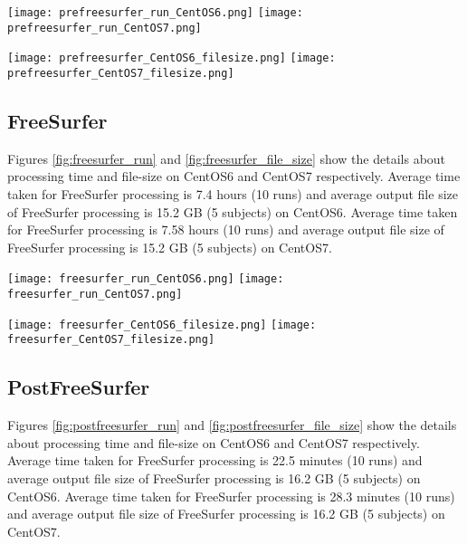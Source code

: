 \begin{center}
\texttt{[image: prefreesurfer\_run\_CentOS6.png]}%
\texttt{[image: prefreesurfer\_run\_CentOS7.png]}
\label{fig:prefreesurfer_run}
\end{center}

\begin{center}
\texttt{[image: prefreesurfer\_CentOS6\_filesize.png]}%
\texttt{[image: prefreesurfer\_CentOS7\_filesize.png]}
\label{fig:prefreesurfer_file_size}
\end{center}

\subsection{FreeSurfer}
Figures \ref{fig:freesurfer_run} and \ref{fig:freesurfer_file_size} show the details about processing time and file-size on CentOS6 and CentOS7 respectively.
Average time taken for FreeSurfer processing is 7.4 hours (10 runs) and average output file size of FreeSurfer processing is 15.2 GB (5 subjects) on CentOS6.
Average time taken for FreeSurfer processing is 7.58 hours (10 runs) and average output file size of FreeSurfer processing is 15.2 GB (5 subjects) on CentOS7.

\begin{center}
\texttt{[image: freesurfer\_run\_CentOS6.png]}%
\texttt{[image: freesurfer\_run\_CentOS7.png]}
\label{fig:freesurfer_run}
\end{center}

\begin{center}
\texttt{[image: freesurfer\_CentOS6\_filesize.png]}%
\texttt{[image: freesurfer\_CentOS7\_filesize.png]}
\label{fig:freesurfer_file_size}
\end{center}

\subsection{PostFreeSurfer}
Figures \ref{fig:postfreesurfer_run} and \ref{fig:postfreesurfer_file_size} show the details about processing time and file-size on CentOS6 and CentOS7 respectively.
Average time taken for FreeSurfer processing is 22.5 minutes (10 runs) and average output file size of FreeSurfer processing is 16.2 GB (5 subjects) on CentOS6.
Average time taken for FreeSurfer processing is 28.3 minutes (10 runs) and average output file size of FreeSurfer processing is 16.2 GB (5 subjects) on CentOS7.

